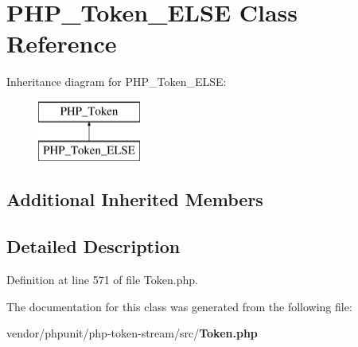 \section{P\+H\+P\+\_\+\+Token\+\_\+\+E\+L\+S\+E Class Reference}
\label{class_p_h_p___token___e_l_s_e}
Inheritance diagram for P\+H\+P\+\_\+\+Token\+\_\+\+E\+L\+S\+E\+:\begin{figure}[H]
\begin{center}
\leavevmode
\includegraphics[height=2.000000cm]{class_p_h_p___token___e_l_s_e}
\end{center}
\end{figure}
\subsection*{Additional Inherited Members}


\subsection{Detailed Description}


Definition at line 571 of file Token.\+php.



The documentation for this class was generated from the following file\+:\begin{DoxyCompactItemize}
\item 
vendor/phpunit/php-\/token-\/stream/src/{\bf Token.\+php}\end{DoxyCompactItemize}

